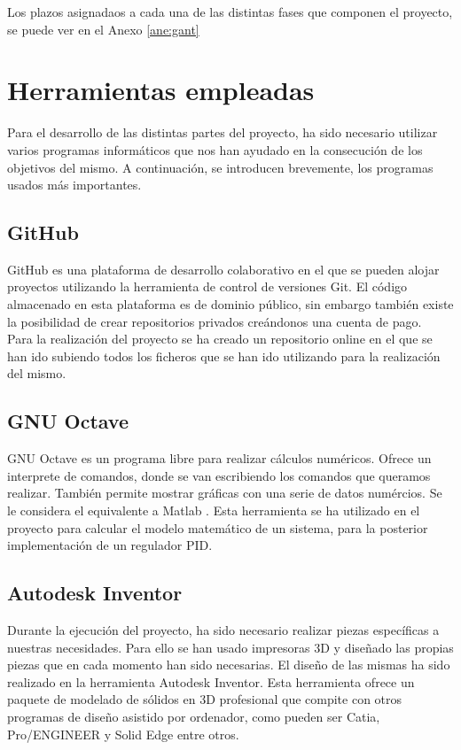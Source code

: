 Los plazos asignadaos a cada una de las distintas fases que componen el proyecto, se puede ver en el Anexo \ref{ane:gant}

\section{Herramientas empleadas}
\label{sec:herramientas}

Para el desarrollo de las distintas partes del proyecto, ha sido necesario utilizar varios programas informáticos que nos han ayudado en la consecución de los objetivos del mismo. A continuación, se introducen brevemente, los programas usados más importantes.

\subsection{GitHub}
GitHub es una plataforma de desarrollo colaborativo en el que se pueden alojar proyectos utilizando la herramienta de control de versiones Git. El código almacenado en esta plataforma es de dominio público, sin embargo también existe la posibilidad de crear repositorios privados creándonos una cuenta de pago.\\

Para la realización del proyecto se ha creado un repositorio online \cite{githubTFG} en el que se han ido subiendo todos los ficheros que se han ido utilizando para la realización del mismo.


\subsection{GNU Octave}
GNU Octave es un programa libre para realizar cálculos numéricos. Ofrece un interprete de comandos, donde se van escribiendo los comandos que queramos realizar. También permite mostrar gráficas con una serie de datos numércios. Se le considera el equivalente a Matlab \cite{octave}. Esta herramienta se ha utilizado en el proyecto para calcular el modelo matemático de un sistema, para la posterior implementación de un regulador PID.

\subsection{Autodesk Inventor}
Durante la ejecución del proyecto, ha sido necesario realizar piezas específicas a nuestras necesidades. Para ello se han usado impresoras 3D y diseñado las propias piezas que en cada momento han sido necesarias. El diseño de las mismas ha sido realizado en la herramienta Autodesk Inventor. Esta herramienta ofrece un paquete de modelado de sólidos en 3D profesional que compite con otros programas de diseño asistido por ordenador, como pueden ser Catia, Pro/ENGINEER y Solid Edge entre otros.

